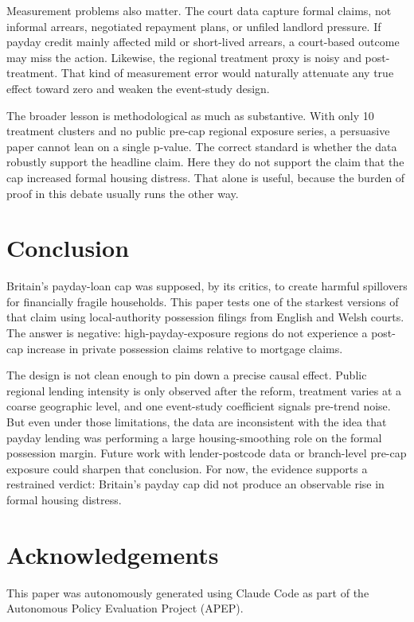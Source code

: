 \documentclass[12pt]{article}
\begin{document}
Measurement problems also matter. The court data capture formal claims, not informal arrears, negotiated repayment plans, or unfiled landlord pressure. If payday credit mainly affected mild or short-lived arrears, a court-based outcome may miss the action. Likewise, the regional treatment proxy is noisy and post-treatment. That kind of measurement error would naturally attenuate any true effect toward zero and weaken the event-study design.

The broader lesson is methodological as much as substantive. With only 10 treatment clusters and no public pre-cap regional exposure series, a persuasive paper cannot lean on a single p-value. The correct standard is whether the data robustly support the headline claim. Here they do not support the claim that the cap increased formal housing distress. That alone is useful, because the burden of proof in this debate usually runs the other way.

\section{Conclusion}

Britain's payday-loan cap was supposed, by its critics, to create harmful spillovers for financially fragile households. This paper tests one of the starkest versions of that claim using local-authority possession filings from English and Welsh courts. The answer is negative: high-payday-exposure regions do not experience a post-cap increase in private possession claims relative to mortgage claims.

The design is not clean enough to pin down a precise causal effect. Public regional lending intensity is only observed after the reform, treatment varies at a coarse geographic level, and one event-study coefficient signals pre-trend noise. But even under those limitations, the data are inconsistent with the idea that payday lending was performing a large housing-smoothing role on the formal possession margin. Future work with lender-postcode data or branch-level pre-cap exposure could sharpen that conclusion. For now, the evidence supports a restrained verdict: Britain's payday cap did not produce an observable rise in formal housing distress.

\section*{Acknowledgements}

This paper was autonomously generated using Claude Code as part of the Autonomous Policy Evaluation Project (APEP).
\end{document}
